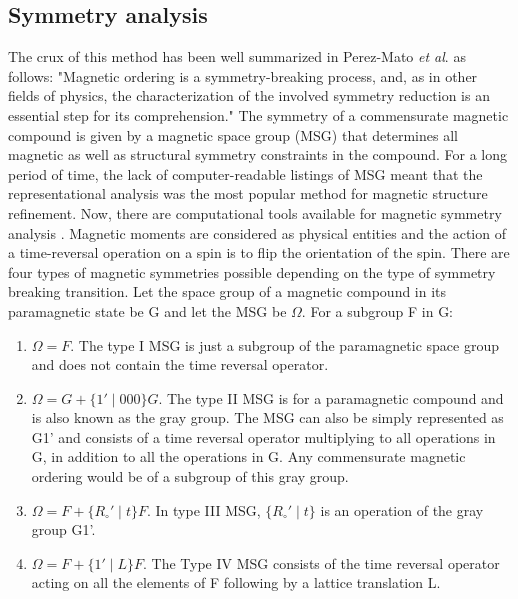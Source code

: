 \documentclass[letterpaper,10pt,doublespacing,edeposit]{uiucthesis2020}
\begin{document}
\begin{mainmatter}
\section{Symmetry analysis}


The crux of this method has been well summarized in Perez-Mato \emph{et al}. \cite{Perez-Mato2015} as follows: "Magnetic ordering is a symmetry-breaking process, and, as in other fields of physics, the characterization of the involved symmetry reduction is an essential step for its comprehension." The symmetry of a commensurate magnetic compound is given by a magnetic space group (MSG) that determines all magnetic as well as structural symmetry constraints in the compound. For a long period of time, the lack of computer-readable listings of MSG meant that the representational analysis was the most popular method for magnetic structure refinement. Now, there are computational tools available for magnetic symmetry analysis \cite{Perez-Mato2015,Gallego2016_1,Gallego2016_2}. Magnetic moments are considered as physical entities and the action of a time-reversal operation on a spin is to flip the orientation of the spin. There are four types of magnetic symmetries possible depending on the type of symmetry breaking transition. Let the space group of a magnetic compound in its paramagnetic state be G and let the MSG be $\Omega$. For a subgroup F in G:

\begin{enumerate}
\item $\Omega = F$. The type I MSG is just a subgroup of the paramagnetic space group and does not contain the time reversal operator.
\item $\Omega = G + \{1' \mid 000\}G$. The type II MSG is for a paramagnetic compound and is also known as the gray group. The MSG can also be simply represented as G1' and consists of a time reversal operator multiplying to all operations in G, in addition to all the operations in G. Any commensurate magnetic ordering would be of a subgroup of this gray group.
\item $\Omega = F + \{R_\circ' \mid t\}F$. In type III MSG, $\{R_\circ' \mid t\}$ is an operation of the gray group G1'.
\item $\Omega = F + \{1' \mid L\}F$. The Type IV MSG consists of the time reversal operator acting on all the elements of F following by a lattice translation L.
\end{enumerate}


\end{mainmatter}
\end{document}
